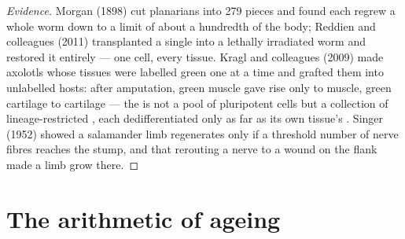 \begin{proof}[Evidence]
Morgan (1898) cut planarians into 279 pieces and found each regrew a
whole worm down to a limit of about a hundredth of the body; Reddien
and colleagues (2011) transplanted a single  into a lethally
irradiated worm and restored it entirely --- one cell, every tissue.
Kragl and colleagues (2009) made axolotls whose tissues were labelled
green one at a time and grafted them into unlabelled hosts: after
amputation, green muscle gave rise only to muscle, green cartilage to
cartilage --- the  is not a pool of pluripotent cells but a
collection of lineage-restricted , each dedifferentiated
only as far as its own tissue's . Singer (1952) showed a
salamander limb regenerates only if a threshold number of nerve
fibres reaches the stump, and that rerouting a nerve to a wound on the
flank made a limb grow there.
\end{proof}

\section{The arithmetic of ageing}

